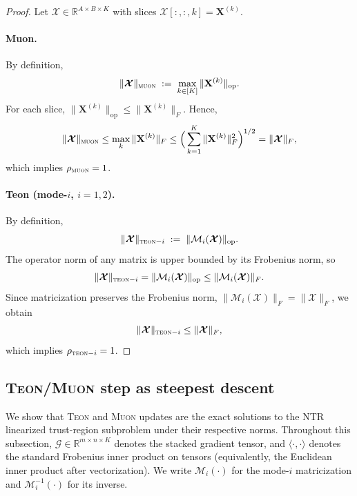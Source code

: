 \documentclass{article}
\newcommand{\ten}[1]{\bm{\mathcal{#1}}}
\newcommand{\mat}[1]{\mathbf{#1}}
\theoremstyle{plain}
\theoremstyle{definition}
\theoremstyle{remark}
\begin{document}
\begin{proof}
Let $\ten{X}\in\mathbb{R}^{A\times B\times K}$ with slices
$\ten{X}[:,:,k]=\mat{X}^{(k)}$.

\paragraph{Muon.}
By definition,
\[
\|\ten{X}\|_{\textsc{muon}}
\;:=\;
\max_{k\in[K]}\|\mat{X}^{(k)}\|_{\mathrm{op}} .
\]
For each slice,
$\|\mat{X}^{(k)}\|_{\mathrm{op}}\le \|\mat{X}^{(k)}\|_{F}$.
Hence,
\[
\|\ten{X}\|_{\textsc{muon}}
\le
\max_k \|\mat{X}^{(k)}\|_{F}
\le
\Big(\sum_{k=1}^K \|\mat{X}^{(k)}\|_{F}^2\Big)^{1/2}
=
\|\ten{X}\|_{F},
\]
which implies $\rho_{\textsc{muon}}=1$.

\paragraph{Teon (mode-$i$, $i=1,2$).}
By definition,
\[
\|\ten{X}\|_{\textsc{teon}-i}
\;:=\;
\|\mathcal{M}_i(\ten{X})\|_{\mathrm{op}} .
\]
The operator norm of any matrix is upper bounded by its Frobenius norm,
so
\[
\|\ten{X}\|_{\textsc{teon}-i}
=
\|\mathcal{M}_i(\ten{X})\|_{\mathrm{op}}
\le
\|\mathcal{M}_i(\ten{X})\|_{F}.
\]
Since matricization preserves the Frobenius norm,
$\|\mathcal{M}_i(\ten{X})\|_{F}=\|\ten{X}\|_{F}$,
we obtain
\[
\|\ten{X}\|_{\textsc{teon}-i}\le \|\ten{X}\|_{F},
\]
which implies $\rho_{\textsc{teon}-i}=1$.
\end{proof}

\subsection{\textsc{Teon}/\textsc{Muon} step as steepest descent}
\label{app:teon-muon-steepest}

We show that \textsc{Teon} and \textsc{Muon} updates are the exact solutions to the NTR linearized trust-region
subproblem under their respective norms. Throughout this subsection, $\ten{G}\in\mathbb{R}^{m\times n\times K}$
denotes the stacked gradient tensor, and $\langle \cdot,\cdot\rangle$ denotes the standard Frobenius inner product on
tensors (equivalently, the Euclidean inner product after vectorization). We write $\mathcal{M}_i(\cdot)$ for the
mode-$i$ matricization and $\mathcal{M}_i^{-1}(\cdot)$ for its inverse.
\end{document}
